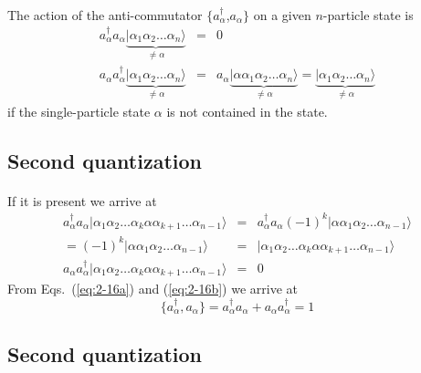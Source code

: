 \documentclass[%
twoside,                 %
final,                   %
10pt]{article}
\begin{document}
\paragraph{}
The action of the anti-commutator 
$\{a_\alpha^{\dagger}$,$a_\alpha\}$ on a given $n$-particle state is
\begin{eqnarray}
	a_\alpha^{\dagger} a_\alpha \underbrace{|\alpha_1\alpha_2 \dots \alpha_{n}\rangle}_{\neq \alpha} &=& 0 \nonumber \\
	a_\alpha a_\alpha^{\dagger} \underbrace{|\alpha_1\alpha_2 \dots \alpha_{n}\rangle}_{\neq \alpha} &=&
	a_\alpha \underbrace{|\alpha \alpha_1\alpha_2 \dots \alpha_{n}\rangle}_{\neq \alpha} = 
	\underbrace{|\alpha_1\alpha_2 \dots \alpha_{n}\rangle}_{\neq \alpha} \label{eq:2-16a}
\end{eqnarray}
if the single-particle state $\alpha$ is not contained in the state.




\subsection{Second quantization}

\paragraph{}
 If it is present
we arrive at
\begin{eqnarray}
	a_\alpha^{\dagger} a_\alpha |\alpha_1\alpha_2 \dots \alpha_{k}\alpha \alpha_{k+1} \dots \alpha_{n-1}\rangle &=&
	a_\alpha^{\dagger} a_\alpha (-1)^k |\alpha \alpha_1\alpha_2 \dots \alpha_{n-1}\rangle \nonumber \\
	= (-1)^k |\alpha \alpha_1\alpha_2 \dots \alpha_{n-1}\rangle &=& 
	|\alpha_1\alpha_2 \dots \alpha_{k}\alpha \alpha_{k+1} \dots \alpha_{n-1}\rangle \nonumber \\
	a_\alpha a_\alpha^{\dagger}|\alpha_1\alpha_2 \dots \alpha_{k}\alpha \alpha_{k+1} \dots \alpha_{n-1}\rangle &=& 0 \label{eq:2-16b}
\end{eqnarray}
From Eqs.~(\ref{eq:2-16a}) and  (\ref{eq:2-16b}) we arrive at 
\begin{equation}
	\{a_\alpha^{\dagger} , a_\alpha \} = a_\alpha^{\dagger} a_\alpha + a_\alpha a_\alpha^{\dagger} = 1 \label{eq:2-17}
\end{equation}




\subsection{Second quantization}
\end{document}
